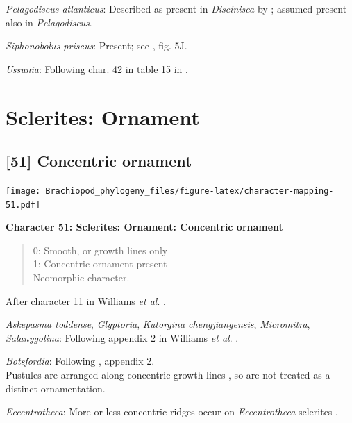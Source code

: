 \documentclass[openany]{book}
\theoremstyle{definition}
\theoremstyle{definition}
\theoremstyle{definition}
\theoremstyle{remark}
\begin{document}
\hypertarget{Pelagodiscus_atlanticus-coding-50}{}
\emph{Pelagodiscus atlanticus}: Described as present in
\emph{Discinisca} by \citet{Chen2007Reinterpretationof}; assumed present
also in \emph{Pelagodiscus}.

\hypertarget{Siphonobolus_priscus-coding-50}{}
\emph{Siphonobolus priscus}: Present; see
\citet{Popov2009Earlyontogeny}, fig. 5J.

\hypertarget{Ussunia-coding-50}{}
\emph{Ussunia}: Following char. 42 in table 15 in
\citet{Williams2000LinguliformeaCraniiformea}.

\section{Sclerites: Ornament}\label{sclerites-ornament}

\subsection*{{[}51{]} Concentric ornament}\label{concentric-ornament}

\texttt{[image: Brachiopod\_phylogeny\_files/figure-latex/character-mapping-51.pdf]}

\textbf{Character 51: Sclerites: Ornament: Concentric ornament}

\begin{quote}
0: Smooth, or growth lines only\\
1: Concentric ornament present\\
Neomorphic character.
\end{quote}

After character 11 in Williams \emph{et al}.
\citeyearpar{Williams1998Thediversity}.

\hypertarget{Askepasma_toddense-coding-51}{}
\emph{Askepasma toddense}, \emph{Glyptoria}, \emph{Kutorgina
chengjiangensis}, \emph{Micromitra}, \emph{Salanygolina}: Following
appendix 2 in Williams \emph{et al}.
\citeyearpar{Williams1998Thediversity}.

\hypertarget{Botsfordia-coding-51}{}
\emph{Botsfordia}: Following \citet{Williams1998Thediversity}, appendix
2.\\
Pustules are arranged along concentric growth lines
\citep{Skovsted2005EarlyCambrian}, so are not treated as a distinct
ornamentation.

\hypertarget{Eccentrotheca-coding-51}{}
\emph{Eccentrotheca}: More or less concentric ridges occur on
\emph{Eccentrotheca} sclerites
\citep{Skovsted2011Scleritomeconstruction}.
\end{document}
